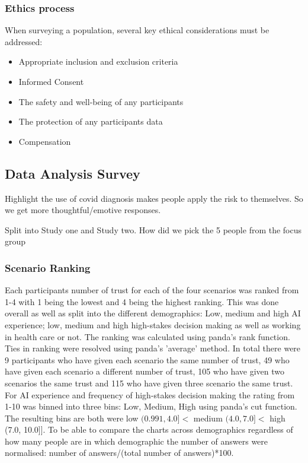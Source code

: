 \documentclass[manuscript,screen,review]{acmart}
\begin{document}
\subsubsection{Ethics process}

When surveying a population, several key ethical considerations must be addressed:
\begin{itemize}
    \item Appropriate inclusion and exclusion criteria
    \item Informed Consent
    \item The safety and well-being of any participants
    \item The protection of any participants data 
    \item Compensation
\end{itemize}
 

\subsection{Data Analysis Survey}


Highlight the use of covid diagnosis makes people apply the risk to themselves. So we get more thoughtful/emotive responses.

Split into Study one and Study two.
How did we pick the 5 people from the focus group

\subsubsection{Scenario Ranking}

Each participants number of trust for each of the four scenarios was ranked from 1-4 with 1 being the lowest and 4 being the highest ranking. This was done overall as well as split into the different demographics: Low, medium and high AI experience; low, medium and high high-stakes decision making as well as working in health care or not. The ranking was calculated using panda's rank function. Ties in ranking were resolved using panda's 'average' method\cite{mckinney-proc-scipy-2010}. In total there were 9 participants who have given each scenario the same number of trust, 49 who have given each scenario a different number of trust, 105 who have given two scenarios the same trust and 115 who have given three scenario the same trust. For AI experience and frequency of high-stakes decision making the rating from 1-10 was binned into three bins: Low, Medium, High using panda's cut function\cite{mckinney-proc-scipy-2010}. The resulting bins are both were low $(0.991, 4.0] <$ medium $(4.0, 7.0] <$ high (7.0, 10.0]]. To be able to compare the charts across demographics regardless of how many people are in which demographic the number of answers were normalised: number of answers/(total number of answers)*100.
\end{document}
